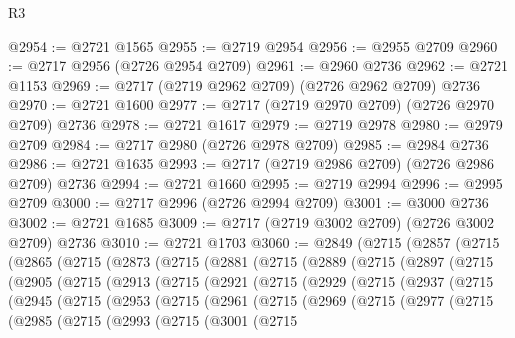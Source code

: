 \begin{lexlean}{R3}
\begin{coremodule}
@2954 := @2721 @1565
@2955 := @2719 @2954
@2956 := @2955 @2709
@2960 := @2717 @2956 (@2726 @2954 @2709)
@2961 := @2960 @2736
@2962 := @2721 @1153
@2969 := @2717 (@2719 @2962 @2709) (@2726 @2962 @2709) @2736
@2970 := @2721 @1600
@2977 := @2717 (@2719 @2970 @2709) (@2726 @2970 @2709) @2736
@2978 := @2721 @1617
@2979 := @2719 @2978
@2980 := @2979 @2709
@2984 := @2717 @2980 (@2726 @2978 @2709)
@2985 := @2984 @2736
@2986 := @2721 @1635
@2993 := @2717 (@2719 @2986 @2709) (@2726 @2986 @2709) @2736
@2994 := @2721 @1660
@2995 := @2719 @2994
@2996 := @2995 @2709
@3000 := @2717 @2996 (@2726 @2994 @2709)
@3001 := @3000 @2736
@3002 := @2721 @1685
@3009 := @2717 (@2719 @3002 @2709) (@2726 @3002 @2709) @2736
@3010 := @2721 @1703
@3060 := @2849
    (@2715
      (@2857
        (@2715
          (@2865
            (@2715
              (@2873
                (@2715
                  (@2881
                    (@2715
                      (@2889
                        (@2715
                          (@2897
                            (@2715
                              (@2905
                                (@2715
                                  (@2913
                                    (@2715
                                      (@2921
                                        (@2715
                                          (@2929
                                            (@2715
                                              (@2937
                                                (@2715
                                                  (@2945
                                                    (@2715
                                                      (@2953
                                                        (@2715
                                                          (@2961
                                                            (@2715
                                                              (@2969
                                                                (@2715
                                                                  (@2977
                                                                    (@2715
                                                                      (@2985
                                                                        (@2715
                                                                          (@2993
                                                                            (@2715
                                                                              (@3001
                                                                                (@2715

\end{coremodule}
\end{lexlean}
